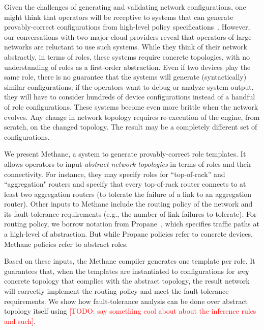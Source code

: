 \documentclass[numbers, 10pt, preprint]{sigplanconf}
\newcommand{\todo}[1]{\textcolor{red}{[TODO: #1]}}
\newcommand{\sysname}{{\small \sf Methane}\xspace}
\begin{document}

Given the challenges of generating and validating network configurations, one
might think that operators will be receptive to systems that can generate
provably-correct configurations from high-level policy
specifications~\cite{x,y,z,configassure,propane}. However, our conversations
with two major cloud providers reveal that operators of large networks are
reluctant to use such systems. While they think of their network abstractly, in
terms of roles, these systems require concrete topologies, with no understanding
of roles as a first-order abstraction.  Even if two devices play the same role,
there is no guarantee that the systems will generate (syntactically) similar
configurations; if the operators want to debug or analyze system output, they
will have to consider hundreds of device configurations instead of a handful of
role configurations. These systems become even more brittle when the network
evolves. Any change in network topology requires re-execution of the engine,
from scratch, on the changed topology.  The result may be a completely different
set of configurations.

We present \sysname, a system to generate provably-correct role templates. It
allows operators to input \emph{abstract network topologies} in terms of roles
and their connectivity. For instance, they may specify roles for ``top-of-rack''
and ``aggregation" routers and specify that every top-of-rack router connects to
at least two aggregation routers (to tolerate the failure of a link to an
aggregation router). Other inputs to \sysname include the routing policy of the
network and its fault-tolerance requirements (e.g., the number of link failures
to tolerate). For routing policy, we borrow notation from
Propane~\cite{propane},  which specifies traffic paths at a high-level of
abstraction. But while Propane policies refer to concrete devices, \sysname
policies refer to abstract roles.

Based on these inputs, the \sysname compiler generates one template per role. It
guarantees that, when the templates are instantiated to configurations for {\em
any} concrete topology that complies with the abstract topology, the result
network will correctly implement the routing policy and meet the fault-tolerance
requirements. We show how fault-tolerance analysis can be done over abstract
topology itself using \todo{say something cool about about the inference rules
and such}.
\end{document}
